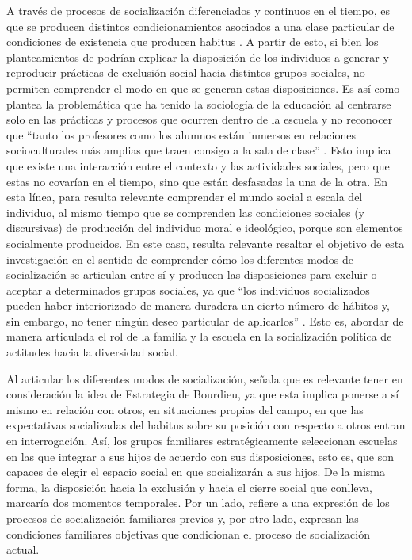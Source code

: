 \documentclass[12pt,twoside]{templates/facsothesis}
\begin{document}
A través de procesos de socialización diferenciados y continuos en el tiempo, es que se producen distintos condicionamientos asociados a una clase particular de condiciones de existencia que producen habitus \citep{bourdieu_sentido_2007}. A partir de esto, si bien los planteamientos de \citet{bourdieu_sentido_2007} podrían explicar la disposición de los individuos a generar y reproducir prácticas de exclusión social hacia distintos grupos sociales, no permiten comprender el modo en que se generan estas disposiciones. Es así como \citet{archer_teoria_2009} plantea la problemática que ha tenido la sociología de la educación al centrarse solo en las prácticas y procesos que ocurren dentro de la escuela y no reconocer que ``tanto los profesores como los alumnos están inmersos en relaciones socioculturales más amplias que traen consigo a la sala de clase'' \citep[p.~39]{archer_teoria_2009}. Esto implica que existe una interacción entre el contexto y las actividades sociales, pero que estas no covarían en el tiempo, sino que están desfasadas la una de la otra. En esta línea, para \citet{lahire_teoria_2012} resulta relevante comprender el mundo social a escala del individuo, al mismo tiempo que se comprenden las condiciones sociales (y discursivas) de producción del individuo moral e ideológico, porque son elementos socialmente producidos. En este caso, resulta relevante resaltar el objetivo de esta investigación en el sentido de comprender cómo los diferentes modos de socialización se articulan entre sí y producen las disposiciones para excluir o aceptar a determinados grupos sociales, ya que ``los individuos socializados pueden haber interiorizado de manera duradera un cierto número de hábitos y, sin embargo, no tener ningún deseo particular de aplicarlos'' \citep[p.~87]{lahire_teoria_2012}. Esto es, abordar de manera articulada el rol de la familia y la escuela en la socialización política de actitudes hacia la diversidad social.

Al articular los diferentes modos de socialización, \citet{aedohenriquez_habitus_2015} señala que es relevante tener en consideración la idea de Estrategia de Bourdieu, ya que esta implica ponerse a sí mismo en relación con otros, en situaciones propias del campo, en que las expectativas socializadas del habitus sobre su posición con respecto a otros entran en interrogación. Así, los grupos familiares estratégicamente seleccionan escuelas en las que integrar a sus hijos de acuerdo con sus disposiciones, esto es, que son capaces de elegir el espacio social en que socializarán a sus hijos. De la misma forma, la disposición hacia la exclusión y hacia el cierre social que conlleva, marcaría dos momentos temporales. Por un lado, refiere a una expresión de los procesos de socialización familiares previos y, por otro lado, expresan las condiciones familiares objetivas que condicionan el proceso de socialización actual.
\end{document}
